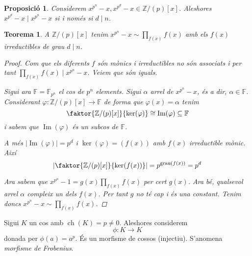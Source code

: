 \documentclass[a4paper,11pt]{report}
\renewcommand{\div}{\mid}
\newcommand{\ordre}[1]{|#1|}
\DeclareMathOperator{\grau}{grau}
\DeclareMathOperator{\ch}{ch}
\theoremstyle{theorem}
\newtheorem{proposicio}{\normalfont \sffamily\bfseries Proposició}[section]
\newtheorem{teorema}{\normalfont \sffamily\bfseries Teorema}[section]
\theoremstyle{definition}
\DeclareMathOperator{\ima}{Im}
\begin{document}
\begin{proposicio}
	Considerem $x^{p^n}-x,x^{p^d}-x\in\mathbb{Z}/(p)[x]$. Aleshores $x^{p^d}-x\div x^{p^n}-x $ si i només si $d\div n$.
\end{proposicio}
\begin{teorema}
	A $\mathbb{Z}/(p)[x]$ tenim $x^{p^n}-x\sim\prod_{f(x)} f(x)$ amb els $f(x)$ irreductibles de grau $d\div n$.
	\begin{proof}
	Com que els diferents $f$ són mònics i irreductibles no són associats i per tant $\prod_{f(x)} f(x)\div x^{p^n}-x$. Veiem que són iguals.
		
		Sigui ara $\mathbb{F}=\mathbb{F}_{p^n}$ el cos de $p^n$ elements. Sigui $\alpha$ arrel de $x^{p^n}-x$, és a dir, $\alpha\in \mathbb{F}$. Considerant $\varphi: \mathbb{Z}/(p)[x]\longrightarrow \mathbb{F}$ de forma que $\varphi(x)=\alpha$ tenim $$\faktor{\mathbb{Z}/(p)[x]}{\ker(\varphi)}\cong \ima(\varphi)\subseteq\mathbb{F}$$
		i sabem que $\ima(\varphi)$ és un subcos de $\mathbb{F}$.
		
		A més $\ordre{\ima(\varphi)}=p^d$ i $\ker(\varphi)=(f(x))$ amb $f(x)$ irreductible mònic. Així$$\ordre{\faktor{\mathbb{Z}/(p)[x]}{\ker(f(x))}}=p^{\grau(f(x))}=p^d$$
		
		Ara sabem que $x^{p^n}-1=g(x)\prod_{f(x)} f(x)$ per cert $g(x)$. Ara bé, qualsevol arrel $\alpha$ compleix un dels $f(x)$. Per tant $g$ no té cap i és una constant. Tenim doncs $x^{p^n}-x\sim\prod_{f(x)} f(x)$.
	\end{proof}
\end{teorema}

Sigui $K$ un cos amb $\ch(K)=p\neq 0$. Aleshores considerem $$\phi:K\longrightarrow K$$ donada per $\phi(a)=a^p$. És un morfisme de cossos (injectiu). S'anomena \emph{morfisme de Frobenius}.
\end{document}
